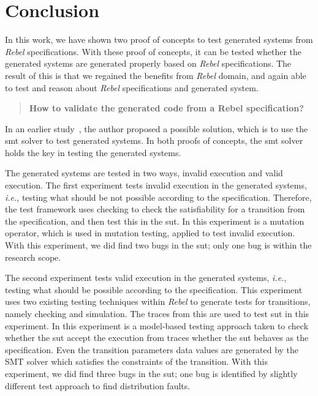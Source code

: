 \chapter{Conclusion}\label{sec:ch7}

In this work, we have shown two proof of concepts to test generated systems from
\textit{Rebel} specifications. With these proof of concepts, it can be tested
whether the generated systems are generated properly based on \textit{Rebel}
specifications. The result of this is that we regained the benefits from
\textit{Rebel} domain, and again able to test and reason about \textit{Rebel}
specifications and generated system.

\begin{quote}
  \textbf{How to validate the generated code from a Rebel specification?}
\end{quote}

In an earlier study~\cite[p.3]{stoel2015case}, the author proposed a possible
solution, which is to use the \gls{smt} solver to test generated systems.
In both proofs of concepts, the \gls{smt} solver holds the key in testing the
generated systems.

The generated systems are tested in two ways, invalid execution and valid execution.
The first experiment tests invalid execution in the generated systems, \textit{i.e.},
testing what should be not possible according to the specification.
Therefore, the test framework uses checking to check the satisfiability for a
transition from the specification, and then test this in the \gls{sut}.
In this experiment is a mutation operator, which is used in mutation testing,
applied to test invalid execution. With this experiment, we did find two bugs in
the \gls{sut}; only one bug is within the research scope.

The second experiment tests valid execution in the generated systems,
\textit{i.e.}, testing what should be possible according to the specification.
This experiment uses two existing testing techniques within \textit{Rebel} to
generate tests for transitions, namely checking and simulation.
The traces from this are used to test \gls{sut} in this experiment.
In this experiment is a model-based testing approach taken to check whether the
\gls{sut} accept the execution from traces whether the \gls{sut} behaves as the
specification.
Even the transition parameters data values are generated by the SMT solver which
satisfies the constraints of the transition. With this experiment, we did find
three bugs in the \gls{sut}; one bug is identified by slightly different test
approach to find distribution faults.

